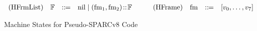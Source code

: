\begin{figure*}[!t]
\[\begin{array}{rcclrcclrccl}
            \text{(HFrmList)} & \mathbb{F} & ::\!\!{=} & 
            \text{nil} \; | \; (\text{fm}_1, \text{fm}_2) \!::\! \mathbb{F}
            & \qquad
            \text{(HFrame)} & \text{fm} & ::\!\!{=} & 
            [v_0, \dots, v_7]
        \end{array}
    \]
    \vspace{-1em}
    \caption{Machine States for Pseudo-SPARCv8 Code}
    \label{fig:machine-state-concur-pseudo-sparc}
    \vspace{-0.5em}
\end{figure*}

